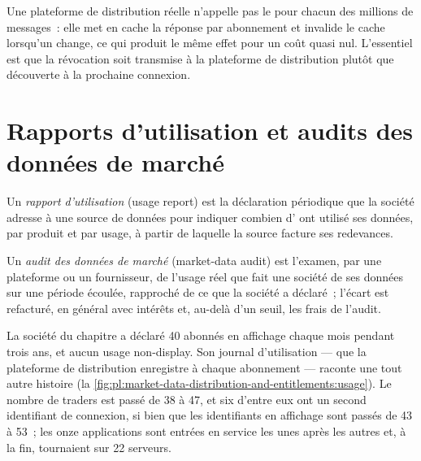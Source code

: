 \label{lst:pl:market-data-distribution-and-entitlements:serve}

Une plateforme de distribution réelle n'appelle pas le  pour chacun des millions de messages~: elle met en cache la réponse par abonnement et invalide le
cache lorsqu'un  change, ce qui produit le même effet pour un coût quasi nul. L'essentiel est que la révocation soit transmise
à la plateforme de distribution plutôt que découverte à la prochaine connexion.

\section{Rapports d'utilisation et audits des données de marché}

\begin{definition}\label{def:pl:market-data-distribution-and-entitlements:report}
Un \emph{rapport d'utilisation} (usage report) est la déclaration périodique que la société adresse à une source de données pour indiquer combien d' ont utilisé ses données,
par produit et par usage, à partir de laquelle la source facture ses redevances.
\end{definition}

\begin{definition}\label{def:pl:market-data-distribution-and-entitlements:audit}
Un \emph{audit des données de marché} (market-data audit) est l'examen, par une plateforme ou un fournisseur, de l'usage réel que fait une société de ses données sur une période écoulée,
rapproché de ce que la société a déclaré~; l'écart est refacturé, en général avec intérêts et, au-delà d'un seuil, les frais de l'audit.
\end{definition}

La société du chapitre a déclaré 40 abonnés en affichage chaque mois pendant trois ans, et aucun usage non-display. Son journal d'utilisation --- que la plateforme de distribution
enregistre à chaque abonnement --- raconte une tout autre histoire (la \cref{fig:pl:market-data-distribution-and-entitlements:usage}). Le nombre de traders est passé de 38
à 47, et six d'entre eux ont un second identifiant de connexion, si bien que les identifiants en affichage sont passés de 43 à 53~; les onze applications sont entrées
en service les unes après les autres et, à la fin, tournaient sur 22 serveurs.


